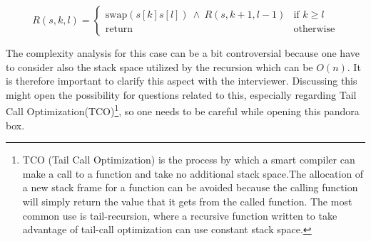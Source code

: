 \begin{equation}
	R(s, k, l)=\begin{cases} 
\text{swap}(s[k]s[l]) \: \wedge \: R(s,k+1, l-1) & \text{if } k\geq l\\
\text{return} & \text{otherwise}
\end{cases}
\label{eq:string_reversal_recursion}
\end{equation} 

The complexity analysis for this case can be a bit controversial because one have to consider also the stack space utilized by the recursion which can be $O(n)$. It is therefore important to clarify this aspect with the interviewer. Discussing this might open the possibility for questions related to this, especially regarding Tail Call Optimization(TCO)\footnote{TCO (Tail Call Optimization) is the process by which a smart compiler can make a call to a function and take no additional stack space.The allocation of a new stack frame for a function can be avoided because the calling function will simply return the value that it gets from the called function. The most common use is tail-recursion, where a recursive function written to take advantage of tail-call optimization can use constant stack space.\nopagebreak}, so one needs to be careful while opening this pandora box.

